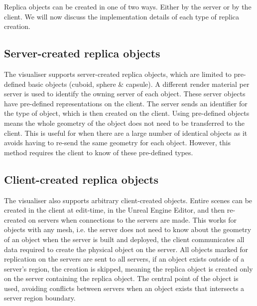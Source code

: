 Replica objects can be created in one of two ways. Either by the server or by the client. We will now discuss the implementation details of each type of replica creation.

\subsection{Server-created replica objects}\label{Server-CreatedReplicas}
The visualiser supports server-created replica objects, which are limited to pre-defined basic objects (cuboid, sphere \& capsule). A different render material per server is used to identify the owning server of each object. These server objects have pre-defined representations on the client. The server sends an identifier for the type of object, which is then created on the client. Using pre-defined objects means the whole geometry of the object does not need to be transferred to the client. This is useful for when there are a large number of identical objects as it avoids having to re-send the same geometry for each object. However, this method requires the client to know of these pre-defined types.

\subsection{Client-created replica objects}
The visualiser also supports arbitrary client-created objects. Entire scenes can be created in the client at edit-time, in the Unreal Engine Editor, and then re-created on servers when connections to the servers are made. This works for objects with any mesh, i.e. the server does not need to know about the geometry of an object when the server is built and deployed, the client communicates all data required to create the physical object on the server. All objects marked for replication on the servers are sent to all servers, if an object exists outside of a server's region, the creation is skipped, meaning the replica object is created only on the server containing the replica object. The central point of the object is used, avoiding conflicts between servers when an object exists that intersects a server region boundary.

